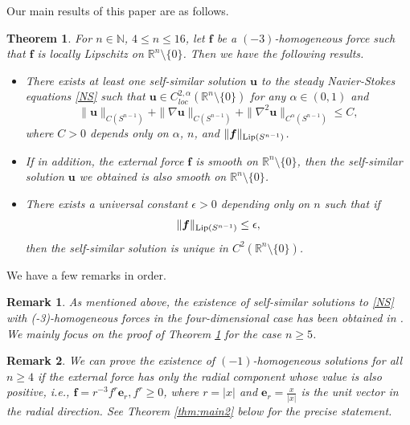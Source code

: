 \documentclass[12pt]{amsart}
\newtheorem{theorem}{Theorem}[section]
\newtheorem{remark}{Remark}[section]
\newcommand{\Bu}{{\boldsymbol{u}}}
\newcommand{\Be}{{\boldsymbol{e}}}
\newcommand{\Bf}{{\boldsymbol{f}}}
\begin{document}
	
	
	Our main results of this paper are as follows.
	\begin{theorem}\label{thm:main}
		For  $n\in\mathbb{N}$,	$4 \leq n \leq 16$, let   $\Bf$ be a $(-3)$-homogeneous force  such that  $\Bf$ is locally Lipschitz on $\mathbb{R}^n \setminus\{0\}$.
		Then we have the following results.
		\begin{itemize}
			\item[(i)]  There exists at least one self-similar solution $\Bu$  to the steady Navier-Stokes equations \eqref{NS} such that  $\Bu  \in C^{2, \alpha}_{loc} (\mathbb{R}^n\setminus\{0\})$ for any $\alpha\in (0,1)$ and
			\begin{equation}\label{eq:C2est}
				\|\Bu\|_{C(S^{n-1})} + 	 	\|\nabla \Bu\|_{C(S^{n-1})} + \|\nabla^2 \Bu\|_{C^{\alpha}(S^{n-1})} \leq C,
			\end{equation}
			where   $C > 0$ depends only on $\alpha$, $n$, and  $\|\Bf\|_{\textnormal{Lip}(S^{n-1})}$.
			\item [(ii)]  If in addition,  the external force $\Bf$ is smooth on $\mathbb{R}^n \setminus \{0\}$, then 
			the self-similar solution $\Bu$  we obtained is also smooth on $\mathbb{R}^n \setminus \{0\}$.
			\item [(iii)]  There exists a universal constant $\epsilon>0$ depending only on $n$ such that if  
			\[
			\|\Bf\|_ {\textnormal{Lip}(S^{n-1})}\leq \epsilon,
			\]
			then the self-similar solution is unique in $C^2(\mathbb{R}^n \setminus \{0\})$.
		\end{itemize}
	\end{theorem}
	
	We have a few remarks in order.
	\begin{remark}
		As mentioned above, the existence of self-similar solutions to \eqref{NS}  with  (-3)-homogeneous forces in the four-dimensional case has been obtained in \cite{Shi18}. We mainly focus on the proof of Theorem \ref{thm:main} for the case  $n\geq 5$.
	\end{remark}
	\begin{remark}
		We can  prove the existence of $(-1)$-homogeneous solutions for all $n\geq 4$
		if the external force  has only the radial component whose value is also positive, i.e., $\Bf=r^{-3}f^r\Be_r, f^r\geq 0$, where $r=|x|$ and $ \Be_r=\frac{x}{|x|}$ is the unit vector in the radial direction. See Theorem \ref{thm:main2} below for the precise statement.
	\end{remark}
	
\end{document}

